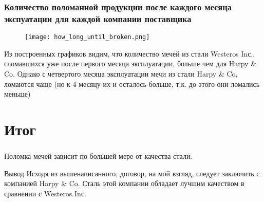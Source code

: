 \documentclass[10pt,pdf,hyperref={unicode}]{beamer}
\begin{document}
\begin{frame}
\frametitle{Количество поломанной продукции после каждого месяца экспуатации для каждой компании поставщика}
\begin{figure}[t]
    \centering
    \texttt{[image: how\_long\_until\_broken.png]}
\end{figure}
Из построенных графиков видим, что количество мечей из стали Westeros Inс., сломавшихся уже после первого месяца эксплуатации, больше чем для Harpy \& Co. Однако с четвертого месяца эксплуатации мечи из стали Harpy \& Co, ломаются чаще (но к 4 месяцу их и осталось больше, т.к. до этого они ломались меньше)
\end{frame}

\section{Итог}

\begin{frame}
\frametitle{\insertsection}
 Поломка мечей зависит по большей мере от качества стали.
  
    
    \begin{block}{Вывод}
    Исходя из вышенаписанного, договор, на мой взгляд, следует заключить с компанией Harpy \& Co. Сталь этой компании обладает лучшим качеством в сравнении с Westeros Inс.
    \end{block}
\end{frame}
\end{document}
